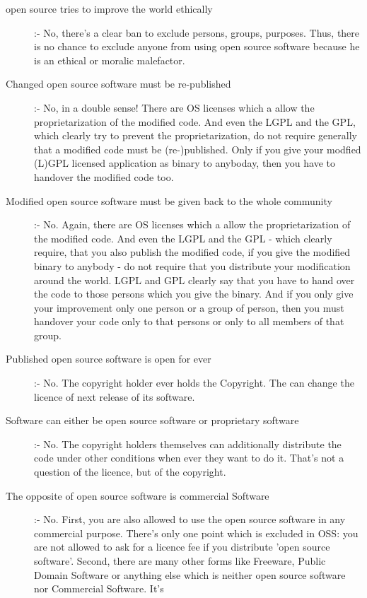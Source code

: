 \begin{description}
  \item[open source tries to improve the world ethically] :- No, there's a clear
  ban to exclude persons, groups, purposes. Thus, there is no chance to exclude
  anyone from using open source software because he is an ethical or moralic
  malefactor.
  \item[Changed open source software must be re-published] :- No, in a double
  sense! There are OS licenses which a allow the proprietarization of the
  modified code. And even the LGPL and the GPL, which clearly try to prevent
  the proprietarization, do not require generally that a modified code must be
  (re-)published. Only if you give your modfied (L)GPL licensed application as
  binary to anyboday, then you have to handover the modified code too.
  \item[Modified open source software must be given back to the whole community]
  :- No. Again, there are OS licenses which a allow the proprietarization of the
  modified code. And even the LGPL and the GPL - which clearly require, that you
  also publish the modified code, if you give the modified binary to anybody -
  do not require that you distribute your modification around the world. LGPL and
  GPL clearly say that you have to hand over the code to those persons which you
  give the binary. And if you only give your improvement only one person or a
  group of person, then you must handover your code only to that persons or
  only to all members of that group.
  \item[Published open source software is open for ever] :- No. The copyright
  holder ever holds the Copyright. The can change the licence of next release of
  its software.
  \item[Software can either be open source software or proprietary software] :-
  No. The copyright holders themselves can additionally distribute the code
  under other conditions when ever they want to do it. That's not a question of
  the licence, but of the copyright.  
  \item[The opposite of open source software is commercial Software] :- No.
  First, you are also allowed to use the open source software in any commercial
  purpose. There's only one point which is excluded in OSS: you are not allowed
  to ask for a licence fee if you distribute 'open source software'. Second,
  there are many other forms like Freeware, Public Domain Software or anything
  else which is neither open source software nor Commercial Software. It's

\end{description}
